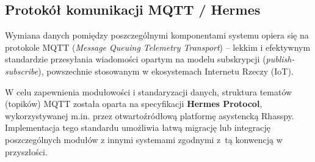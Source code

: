 \documentclass[12pt,a4paper]{article}
\begin{document}
\subsection{Protokół komunikacji MQTT / Hermes}
Wymiana danych pomiędzy poszczególnymi komponentami systemu opiera się na protokole MQTT (\textit{Message Queuing Telemetry Transport}) – lekkim i efektywnym standardzie przesyłania wiadomości opartym na modelu subskrypcji (\textit{publish-subscribe}), powszechnie stosowanym w ekosystemach Internetu Rzeczy (IoT).

W celu zapewnienia modułowości i standaryzacji danych, struktura tematów (topików) MQTT została oparta na specyfikacji \textbf{Hermes Protocol}, wykorzystywanej m.in. przez otwartoźródłową platformę asystencką Rhasspy. Implementacja tego standardu umożliwia łatwą migrację lub integrację poszczególnych modułów z innymi systemami zgodnymi z~tą konwencją w przyszłości.
\end{document}

